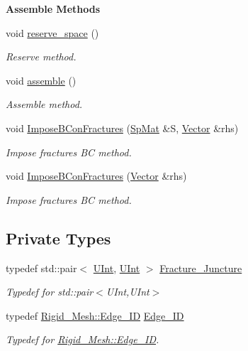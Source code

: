 \begin{Indent}{\bf Assemble Methods}\par
\begin{DoxyCompactItemize}
\item 
void \hyperlink{classFVCode3D_1_1FluxOperator_a9fe4f2f355610d1cbb921382253c3853}{reserve\+\_\+space} ()
\begin{DoxyCompactList}\small\item\em Reserve method. \end{DoxyCompactList}\item 
void \hyperlink{classFVCode3D_1_1FluxOperator_a4f96ac53cafc68eccb01d8ff29eecc87}{assemble} ()
\begin{DoxyCompactList}\small\item\em Assemble method. \end{DoxyCompactList}\item 
void \hyperlink{classFVCode3D_1_1FluxOperator_aeb808234dae8f8d0a188f8c2efcda0ae}{Impose\+B\+Con\+Fractures} (\hyperlink{namespaceFVCode3D_ac1032289d96638cf0ad6c52ef639095f}{Sp\+Mat} \&S, \hyperlink{namespaceFVCode3D_a16ccf345652402bccd1a5d2e6782526c}{Vector} \&rhs)
\begin{DoxyCompactList}\small\item\em Impose fractures BC method. \end{DoxyCompactList}\item 
void \hyperlink{classFVCode3D_1_1FluxOperator_addee183d3fd26f83be07ed70f551e404}{Impose\+B\+Con\+Fractures} (\hyperlink{namespaceFVCode3D_a16ccf345652402bccd1a5d2e6782526c}{Vector} \&rhs)
\begin{DoxyCompactList}\small\item\em Impose fractures BC method. \end{DoxyCompactList}\end{DoxyCompactItemize}
\end{Indent}
\subsection*{Private Types}
\begin{DoxyCompactItemize}
\item 
typedef std\+::pair$<$ \hyperlink{namespaceFVCode3D_a4bf7e328c75d0fd504050d040ebe9eda}{U\+Int}, \hyperlink{namespaceFVCode3D_a4bf7e328c75d0fd504050d040ebe9eda}{U\+Int} $>$ \hyperlink{classFVCode3D_1_1FluxOperator_ab9fef691b58bb04de5814d21fb59ef44}{Fracture\+\_\+\+Juncture}
\begin{DoxyCompactList}\small\item\em Typedef for std\+::pair$<$\+U\+Int,\+U\+Int$>$ \end{DoxyCompactList}\item 
typedef \hyperlink{classFVCode3D_1_1Rigid__Mesh_1_1Edge__ID}{Rigid\+\_\+\+Mesh\+::\+Edge\+\_\+\+ID} \hyperlink{classFVCode3D_1_1FluxOperator_a2c9bcb854de0d6aa308ff7c944a1aa31}{Edge\+\_\+\+ID}
\begin{DoxyCompactList}\small\item\em Typedef for \hyperlink{classFVCode3D_1_1Rigid__Mesh_1_1Edge__ID}{Rigid\+\_\+\+Mesh\+::\+Edge\+\_\+\+ID}. \end{DoxyCompactList}\end{DoxyCompactItemize}
